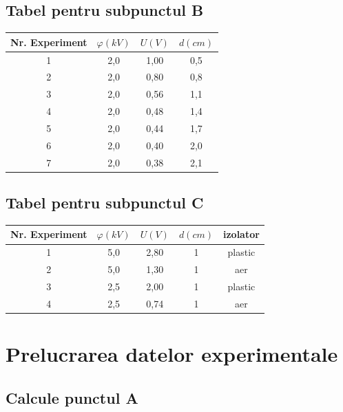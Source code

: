 \documentclass[12pt]{article}
\begin{document}
\subsection{Tabel pentru subpunctul B}

\begin{table}[h!]
    \centering
    \begin{tabular}{|c|c|c|c|}
        \hline
        Nr. Experiment & $\varphi (kV)$ & $U (V)$  & $d (cm)$ \\
        \hline
        1 & 2,0 & 1,00 & 0,5 \\
        \hline
        2 & 2,0 & 0,80 & 0,8 \\
        \hline
        3 & 2,0 & 0,56 & 1,1 \\
        \hline
        4 & 2,0 & 0,48 & 1,4 \\
        \hline
        5 & 2,0 & 0,44 & 1,7 \\
        \hline
        6 & 2,0 & 0,40 & 2,0 \\
        \hline
        7 & 2,0 & 0,38 & 2,1 \\
        \hline
    \end{tabular}
\end{table}

\subsection{Tabel pentru subpunctul C}

\begin{table}[H]
    \centering
    \begin{tabular}{|c|c|c|c|c|}
        \hline
        Nr. Experiment & $\varphi (kV)$ & $U (V)$  & $d (cm)$ & izolator \\
        \hline
        1 & 5,0 & 2,80 & 1 & plastic \\
        \hline
        2 & 5,0 & 1,30 & 1 & aer \\
        \hline
        3 & 2,5 & 2,00 & 1 & plastic \\
        \hline
        4 & 2,5 & 0,74 & 1 & aer\\
        \hline
    \end{tabular}
\end{table}

\section{Prelucrarea datelor experimentale}

\subsection{Calcule punctul A}
\end{document}
